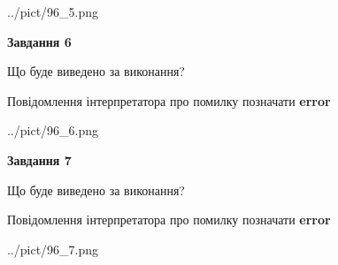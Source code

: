 \documentclass[10pt, ukrainian]{article}
\begin{document}
{\begin {large}
\begin{center}
	{../pict/96_5.png}
\end{center}
\newpage

{\begin {center}\textbf{Завдання 6}\end {center}}\par
Що буде виведено за виконання? \par
Повідомлення інтерпретатора про помилку позначати \textbf{error}

\begin{center}
	{../pict/96_6.png}
\end{center}
\newpage

{\begin {center}\textbf{Завдання 7}\end {center}}\par
Що буде виведено за виконання? \par
Повідомлення інтерпретатора про помилку позначати \textbf{error}

\begin{center}
	{../pict/96_7.png}
\end{center}
\newpage

\end {large}}
\end{document}
